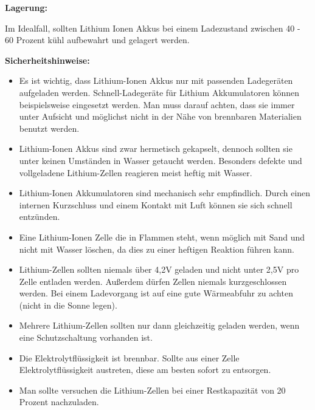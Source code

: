 \textbf{Lagerung:}

Im Idealfall, sollten Lithium Ionen Akkus bei einem Ladezustand zwischen 40 - 60 Prozent kühl aufbewahrt und gelagert werden.


\textbf{Sicherheitshinweise:}

\begin{itemize}
	\item{Es ist wichtig, dass Lithium-Ionen Akkus nur mit passenden Ladegeräten aufgeladen werden. Schnell-Ladegeräte für Lithium Akkumulatoren können beispielsweise eingesetzt werden. Man muss darauf achten, dass sie immer unter Aufsicht und möglichst nicht in der Nähe von brennbaren Materialien benutzt werden.} \medskip\\

	\item {Lithium-Ionen Akkus sind zwar hermetisch gekapselt, dennoch sollten sie unter keinen Umständen in Wasser getaucht werden. Besonders defekte und  vollgeladene Lithium-Zellen reagieren meist heftig mit Wasser.}\medskip\\
	
	\item {Lithium-Ionen Akkumulatoren sind mechanisch sehr empfindlich. Durch einen internen Kurzschluss und einem Kontakt mit Luft können sie sich schnell entzünden.}\medskip\\
	
	\item {Eine Lithium-Ionen Zelle die in Flammen steht, wenn möglich mit Sand und nicht mit Wasser löschen, da dies zu einer heftigen Reaktion führen kann.}\medskip\\
	
	\item {Lithium-Zellen sollten niemals über 4,2V geladen und nicht unter 2,5V pro Zelle entladen werden. Außerdem dürfen Zellen niemals kurzgeschlossen werden. Bei einem Ladevorgang ist auf eine gute Wärmeabfuhr zu achten (nicht in die Sonne legen).}\medskip\\
	
	\item {Mehrere Lithium-Zellen sollten nur dann gleichzeitig geladen werden, wenn eine Schutzschaltung vorhanden ist.}\medskip\\
	
	\item {Die Elektrolytflüssigkeit ist brennbar. Sollte aus einer Zelle Elektrolytflüssigkeit austreten, diese am besten sofort zu entsorgen.}\medskip\\
	
	\item {Man sollte versuchen die Lithium-Zellen bei einer Restkapazität von 20 Prozent nachzuladen.}\medskip\\

\end{itemize}
\newpage

